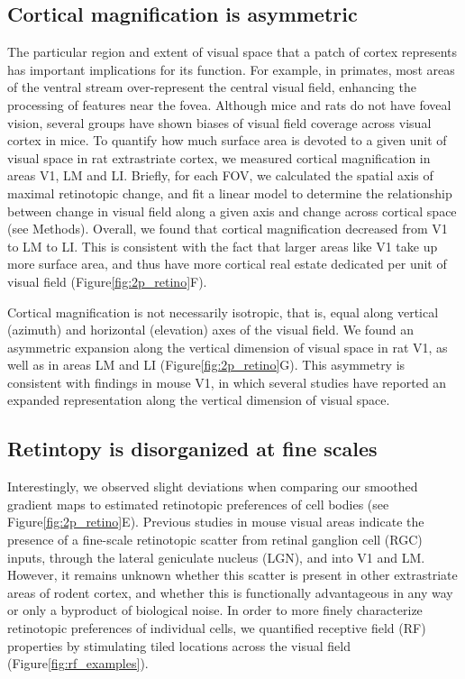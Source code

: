 \subsection{Cortical magnification is asymmetric}
The particular region and extent of visual space that a patch of cortex represents has important implications for its function. For example, in primates, most areas of the ventral stream over-represent the central visual field, enhancing the processing of features near the fovea\cite{REFREF, Gattass2005CorticalDynamics}. Although mice and rats do not have foveal vision, several groups have shown biases of visual field coverage across visual cortex in mice\cite{Garrett2014, Marshel2011, REFREF}. To quantify how much surface area is devoted to a given unit of visual space in rat extrastriate cortex, we measured cortical magnification in areas V1, LM and LI. Briefly, for each FOV, we calculated the spatial axis of maximal retinotopic change, and fit a linear model to determine the relationship between change in visual field along a given axis and change across cortical space (see Methods). Overall, we found that cortical magnification decreased from V1 to LM to LI. This is consistent with the fact that larger areas like V1 take up more surface area, and thus have more cortical real estate dedicated per unit of visual field (Figure\ref{fig:2p_retino}F). 

Cortical magnification is not necessarily isotropic, that is, equal along vertical (azimuth) and horizontal (elevation) axes of the visual field. We found an asymmetric expansion along the vertical dimension of visual space in rat V1, as well as in areas LM and LI (Figure\ref{fig:2p_retino}G). This asymmetry is consistent with findings in mouse V1, in which several studies have reported an expanded representation along the vertical dimension of visual space\cite{Garrett2014, Liang2018, Bonin2011}.  

\subsection{Retintopy is disorganized at fine scales}
Interestingly, we observed slight deviations when comparing our smoothed gradient maps to estimated retinotopic preferences of cell bodies (see Figure\ref{fig:2p_retino}E). Previous studies in mouse visual areas indicate the presence of a fine-scale retinotopic scatter from retinal ganglion cell (RGC) inputs, through the lateral geniculate nucleus (LGN), and into V1 and LM\cite{Liang2018, Andermann2011, Marques2018}. However, it remains unknown whether this scatter is present in other extrastriate areas of rodent cortex, and whether this is functionally advantageous in any way or only a byproduct of biological noise. In order to more finely characterize retinotopic preferences of individual cells, we quantified receptive field (RF) properties by stimulating tiled locations across the visual field (Figure\ref{fig:rf_examples}). 


